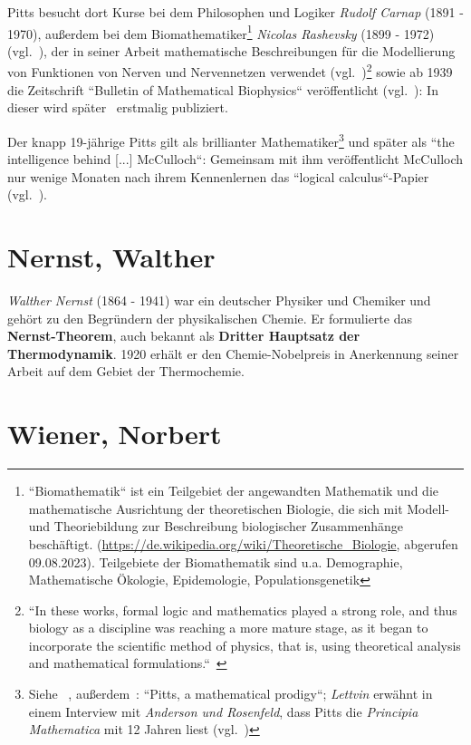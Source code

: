 Pitts besucht dort Kurse bei dem Philosophen und Logiker \textit{Rudolf Carnap} (1891 - 1970), außerdem bei dem Biomathematiker\footnote{
    ``Biomathematik`` ist ein Teilgebiet der angewandten Mathematik und die mathematische Ausrichtung der theoretischen Biologie, die sich mit Modell- und Theoriebildung zur Beschreibung biologischer Zusammenhänge beschäftigt. ({\url{https://de.wikipedia.org/wiki/Theoretische\_Biologie}}, abgerufen 09.08.2023). Teilgebiete der Biomathematik sind u.a. Demographie, Mathematische Ökologie, Epidemologie, Populationsgenetik
} \textit{Nicolas Rashevsky} (1899 - 1972) (vgl.~\cite[184]{Pic04}), der in seiner Arbeit mathematische Beschreibungen für die Modellierung von Funktionen von Nerven und Nervennetzen verwendet (vgl.~\cite[13]{Abr02})\footnote{
    ``In these works, formal logic and mathematics played a strong role, and thus biology as a discipline was reaching a more mature stage, as it began to incorporate the scientific method of physics, that is, using theoretical analysis and mathematical formulations.``~\cite[7]{Abr02}
} sowie ab 1939 die Zeitschrift ``Bulletin of Mathematical Biophysics`` veröffentlicht (vgl.~\cite[16]{Abr02}): In dieser wird später~\cite{MP43} erstmalig publiziert.

Der knapp 19-jährige Pitts gilt als brillianter Mathematiker\footnote{
    Siehe ~\cite[4]{Arb19}, außerdem~\cite[22]{Abr02}: ``Pitts, a mathematical prodigy``;
    \textit{Lettvin} erwähnt in einem Interview mit \textit{Anderson und Rosenfeld}, dass Pitts die \textit{Principia Mathematica} mit 12 Jahren liest (vgl.~\cite[2]{AR98})
} und später als ``the intelligence behind [...] McCulloch``: Gemeinsam mit ihm veröffentlicht McCulloch nur wenige Monaten nach ihrem Kennenlernen das ``logical calculus``-Papier (vgl.~\cite[104]{AR98}).


\section{Nernst, Walther}\label{appendix:nernst}
\textit{Walther Nernst} (1864 - 1941) war ein deutscher Physiker und Chemiker und gehört zu den Begründern der physikalischen Chemie.
Er formulierte das \textbf{Nernst-Theorem}, auch bekannt als \textbf{Dritter Hauptsatz der Thermodynamik}.
1920 erhält er den Chemie-Nobelpreis in Anerkennung seiner Arbeit auf dem Gebiet der Thermochemie.




\section{Wiener, Norbert}\label{appendix:wiener}

